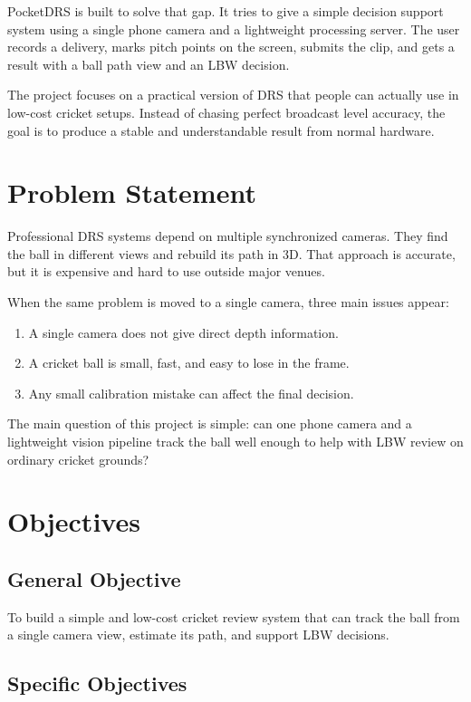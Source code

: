 \documentclass[12pt,a4paper]{article}
\begin{document}
PocketDRS is built to solve that gap. It tries to give a simple decision support system using a single phone camera and a lightweight processing server. The user records a delivery, marks pitch points on the screen, submits the clip, and gets a result with a ball path view and an LBW decision.

The project focuses on a practical version of DRS that people can actually use in low-cost cricket setups. Instead of chasing perfect broadcast level accuracy, the goal is to produce a stable and understandable result from normal hardware.

\section{Problem Statement}

Professional DRS systems depend on multiple synchronized cameras. They find the ball in different views and rebuild its path in 3D. That approach is accurate, but it is expensive and hard to use outside major venues.

When the same problem is moved to a single camera, three main issues appear:

\begin{enumerate}
    \item A single camera does not give direct depth information.
    \item A cricket ball is small, fast, and easy to lose in the frame.
    \item Any small calibration mistake can affect the final decision.
\end{enumerate}

The main question of this project is simple: can one phone camera and a lightweight vision pipeline track the ball well enough to help with LBW review on ordinary cricket grounds?

\section{Objectives}

\subsection{General Objective}

To build a simple and low-cost cricket review system that can track the ball from a single camera view, estimate its path, and support LBW decisions.

\subsection{Specific Objectives}
\end{document}
